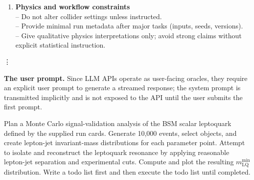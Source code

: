 \documentclass[11pt,oneside]{article}
\numberwithin{equation}{section}
\begin{document}
\begin{orchestralsystemmessage}
\begin{enumerate}
    \textit{Step 3: Execute step-by-step}\\
    For each planned step:
    \begin{enumerate}
        \item Invoke the correct tool with explicit arguments.
        \item Verify outputs (existence or small summary inspection).
        \item Provide a short progress message and proceed to the next step.
    \end{enumerate}
    \textit{\textbf{Work autonomously}} -- proceed through phases without waiting for the user.
    \vspace{0.05in}
    \item \textbf{Physics and workflow constraints}\\
    -- Do not alter collider settings unless instructed.\\
    -- Provide minimal run metadata after major tasks (inputs, seeds, versions).\\
    -- Give qualitative physics interpretations only; avoid strong claims without explicit
    statistical instruction.
\end{enumerate}

    \centerline{\vdots}
    \vspace{0.5em}

\end{orchestralsystemmessage}

\noindent
\textbf{The user prompt.}
Since LLM APIs operate as user-facing oracles, they require an explicit user prompt to generate a streamed response; the system prompt is transmitted implicitly and is not exposed to the API until the user submits the first prompt.

\begin{orchestralusermessage}
    Plan a Monte Carlo signal-validation analysis of the BSM scalar leptoquark defined by the supplied run cards. 
    Generate 10,000 events, select objects, and create lepton-jet invariant-mass distributions for each parameter point.
    Attempt to isolate and reconstruct the leptoquark resonance by applying reasonable lepton-jet separation and experimental cuts. 
    Compute and plot the resulting $m^{\text{min}}_{\text{LQ}}$ distribution. 
    Write a todo list first and then execute the todo list until completed.
\end{orchestralusermessage}
\end{document}
